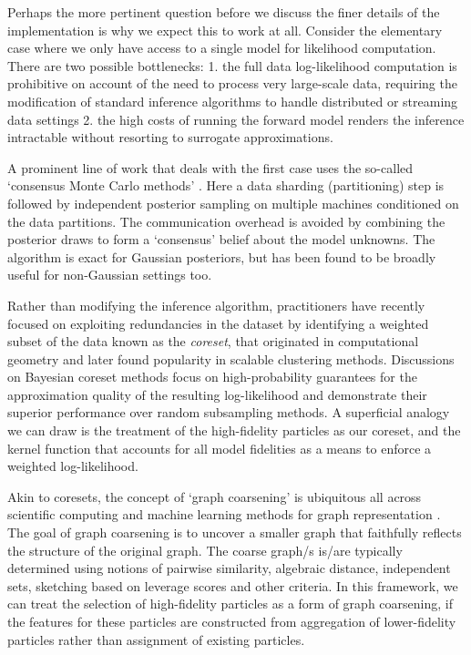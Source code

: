 \documentclass[12pt]{article}
\renewcommand{\[}{\left[}
\renewcommand{\]}{\right]}
\renewcommand{\(}{\left(}
\renewcommand{\)}{\right)}
\begin{document}
Perhaps the more pertinent question before we discuss the finer details of the implementation is why we expect this to work at all. Consider the elementary case where we only have access to a single model for likelihood computation. 
There are two possible bottlenecks: 1. the full data log-likelihood computation is prohibitive on account of the need to process very large-scale data, requiring the modification of standard inference algorithms to handle distributed or streaming data settings 2. the high costs of running the forward model renders the inference intractable without resorting to surrogate approximations. 

A prominent line of work that deals with the first case uses the so-called `consensus Monte Carlo methods' \citep{rabinovich_variational_2015,scott_bayes_2016}. Here a data sharding (partitioning) step is followed by independent posterior sampling on multiple machines conditioned on the data partitions. 
The communication overhead is avoided by combining the posterior draws to form a `consensus' belief about the model unknowns.
The algorithm is exact for Gaussian posteriors, but has been found to be broadly useful for non-Gaussian settings too.

Rather than modifying the inference algorithm, practitioners have recently focused on exploiting redundancies in the dataset by identifying a weighted subset of the data known as the \emph{coreset}, that originated in computational geometry \citep{agarwal_geometric_2007} and later found popularity in scalable clustering methods.
Discussions on Bayesian coreset methods \citep{huggins_coresets_2016,campbell_automated_2019} focus on high-probability guarantees for the approximation quality of the resulting log-likelihood and demonstrate their superior performance over random subsampling methods. A superficial analogy we can draw is the treatment of the high-fidelity particles as our coreset, and the kernel function that accounts for all model fidelities as a means to enforce a weighted log-likelihood.

Akin to coresets, the concept of `graph coarsening' is ubiquitous all across scientific computing and machine learning methods for graph representation \citep{chen_graph_2022}. The goal of graph coarsening is to uncover a smaller graph that faithfully reflects the structure of the original graph. The coarse graph/s is/are typically determined using notions of pairwise similarity, algebraic distance, independent sets, sketching based on leverage scores and other criteria. 
In this framework, we can treat the selection of high-fidelity particles as a form of graph coarsening, if the features for these particles are constructed from aggregation of lower-fidelity particles rather than assignment of existing particles.
\end{document}
